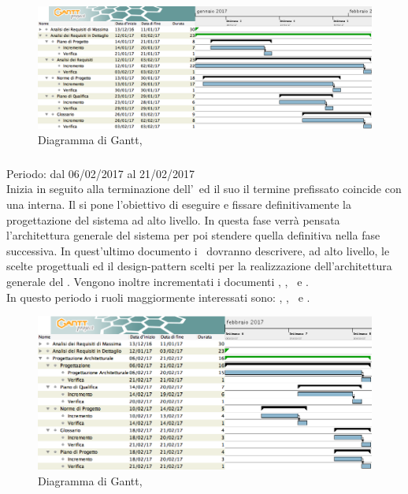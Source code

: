\begin{figure}[H]
	\centering 
	\includegraphics[scale=0.45]{Immagini/Gantt/ARD.png}
	\caption{Diagramma di Gantt, \ARD}
\end{figure}
\newpage
\subsubsection{\PA}
Periodo: dal 06/02/2017 al 21/02/2017 \\

Inizia in seguito alla terminazione dell'\ARD\ ed il suo il termine prefissato coincide con una  interna.
Il  si pone l'obiettivo di eseguire e fissare definitivamente la progettazione del sistema ad alto livello. In questa fase verrà pensata l'architettura generale del sistema per poi stendere quella definitiva nella fase successiva.
In quest'ultimo documento i \ProgP\ dovranno descrivere, ad alto livello, le scelte progettuali ed il design-pattern scelti per la realizzazione dell'architettura generale del . Vengono inoltre incrementati i documenti \NdP, \PdP, \PdQ\ e \Gl.\\
In questo periodo i ruoli maggiormente interessati sono: \Prog, \Pm, \Ver\ e \Am.

 \begin{figure}[H]
	\centering 
	\includegraphics[scale=0.5]{Immagini/Gantt/PA.png}
	\caption{Diagramma di Gantt, \PA}
\end{figure}
\newpage
